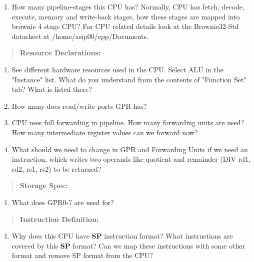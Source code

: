 \documentclass[
]{article}
\begin{document}
\begin{enumerate}
\def\labelenumi{\alph{enumi})}
\item
  How many pipeline-stages this CPU has? Normally, CPU has fetch,
  decode, execute, memory and write-back stages, how these stages are
  mapped into brownie 4 stage CPU? For CPU related details look at the
  Brownie32-Std datasheet at /home/asip00/epp/Documents.
\end{enumerate}

\begin{quote}
\textbf{Resource Declarations:}
\end{quote}

\begin{enumerate}
\def\labelenumi{\alph{enumi})}
\setcounter{enumi}{1}
\item
  See different hardware resources used in the CPU. Select ALU in the
  "Instance" list. What do you understand from the contents of "Function
  Set" tab? What is listed there?
\item
  How many does read/write ports GPR has?
\item
  CPU uses full forwarding in pipeline. How many forwarding units are
  used? How many intermediate register values can we forward now?
\item
  What should we need to change in GPR and Forwarding Units if we need
  an instruction, which writes two operands like quotient and remainder
  (DIV rd1, rd2, rs1, rs2) to be returned?
\end{enumerate}

\begin{quote}
\textbf{Storage Spec:}
\end{quote}

\begin{enumerate}
\def\labelenumi{\alph{enumi})}
\setcounter{enumi}{5}
\item
  What does GPR0-7 are used for?
\end{enumerate}

\begin{quote}
\textbf{Instruction Definition:}
\end{quote}

\begin{enumerate}
\def\labelenumi{\alph{enumi})}
\setcounter{enumi}{6}
\item
  Why does this CPU have \textbf{SP} instruction format? What
  instructions are covered by this \textbf{SP} format? Can we map these
  instructions with some other format and remove SP format from the CPU?
\end{enumerate}
\end{document}

